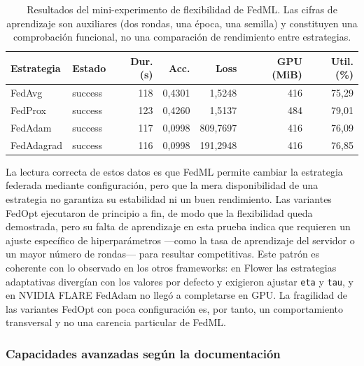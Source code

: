 \begin{table}[htbp]
  \centering
  \caption{Resultados del mini-experimento de flexibilidad de FedML. Las cifras de
  aprendizaje son auxiliares (dos rondas, una época, una semilla) y constituyen una
  comprobación funcional, no una comparación de rendimiento entre estrategias.}
  \label{tab:flex-fedml-resultados}
  \begin{tabular}{llrrrrr}
    \toprule
    \textbf{Estrategia} & \textbf{Estado} & \textbf{Dur. (s)} & \textbf{Acc.} &
    \textbf{Loss} & \textbf{GPU (MiB)} & \textbf{Util. (\%)} \\
    \midrule
    FedAvg     & success & 118 & 0,4301 & 1,5248   & 416 & 75,29 \\
    FedProx    & success & 123 & 0,4260 & 1,5137   & 484 & 79,01 \\
    FedAdam    & success & 117 & 0,0998 & 809,7697 & 416 & 76,09 \\
    FedAdagrad & success & 116 & 0,0998 & 191,2948 & 416 & 76,85 \\
    \bottomrule
  \end{tabular}
\end{table}

La lectura correcta de estos datos es que FedML permite cambiar la estrategia
federada mediante configuración, pero que la mera disponibilidad de una estrategia
no garantiza su estabilidad ni un buen rendimiento. Las variantes FedOpt
ejecutaron de principio a fin, de modo que la flexibilidad queda demostrada, pero su
falta de aprendizaje en esta prueba indica que requieren un ajuste específico de
hiperparámetros —como la tasa de aprendizaje del servidor o un mayor número de
rondas— para resultar competitivas. Este patrón es coherente con lo observado en los
otros frameworks: en Flower las estrategias adaptativas divergían con los valores por
defecto y exigieron ajustar \texttt{eta} y \texttt{tau}, y en NVIDIA FLARE FedAdam no
llegó a completarse en GPU. La fragilidad de las variantes FedOpt con poca
configuración es, por tanto, un comportamiento transversal y no una carencia
particular de FedML.

\subsubsection{Capacidades avanzadas según la documentación}\label{subsec:flex-fedml-doc}

